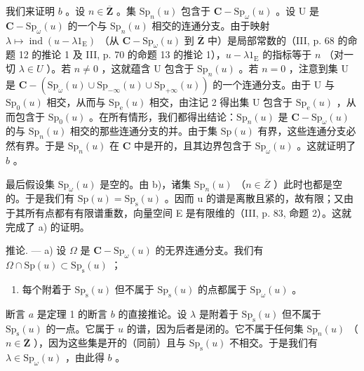 我们来证明 \(b\) 。设 \(n \in \overline{\mathbf{Z}}\) 。集 \(\mathrm{Sp}_n(u)\) 包含于 \(\mathbf{C} - \mathrm{Sp}_{\omega}(u)\) 。设 U 是 \(\mathbf{C} - \mathrm{Sp}_{\omega}(u)\) 的一个与 \(\mathrm{Sp}_n(u)\) 相交的连通分支。由于映射 \(\lambda \mapsto \operatorname{ind}(u - \lambda 1_{\mathrm{E}})\) （从 \(\mathbf{C} - \mathrm{Sp}_{\omega}(u)\) 到 \(\overline{\mathbf{Z}}\) 中）是局部常数的（III, p. 68 的命题 12 的推论 1 及 III, p. 70 的命题 13 的推论 1），\(u - \lambda 1_{\mathrm{E}}\) 的指标等于 \(n\) （对一切 \(\lambda \in U\) ）。若 \(n \neq 0\) ，这就蕴含 U 包含于 \(\mathrm{Sp}_n(u)\) 。若 \(n = 0\) ，注意到集 U 是 \(\mathbf{C} - (\mathrm{Sp}_{\omega}(u) \cup \mathrm{Sp}_{-\infty}(u) \cup \mathrm{Sp}_{+\infty}(u))\) 的一个连通分支。由于 U 与 \(\mathrm{Sp}_0(u)\) 相交，从而与 \(\mathrm{Sp}_{\mathrm{e}}(u)\) 相交，由注记 2 得出集 U 包含于 \(\mathrm{Sp}_{\mathrm{e}}(u)\) ，从而包含于 \(\mathrm{Sp}_0(u)\) 。在所有情形，我们都得出结论：\(\mathrm{Sp}_n(u)\) 是 \(\mathbf{C} - \mathrm{Sp}_{\omega}(u)\) 的与 \(\mathrm{Sp}_n(u)\) 相交的那些连通分支的并。由于集 \(\mathrm{Sp}(u)\) 有界，这些连通分支必然有界。于是 \(\mathrm{Sp}_n(u)\) 在 \(\mathbf{C}\) 中是开的，且其边界包含于 \(\mathrm{Sp}_{\omega}(u)\) 。这就证明了 \(b\) 。

最后假设集 \(\mathrm{Sp}_{\omega}(u)\) 是空的。由 b)，诸集 \(\mathrm{Sp}_{n}(u)\) （\(n \in \overline{Z}\) ）此时也都是空的。于是我们有 \(\mathrm{Sp}(u) = \mathrm{Sp}_{\mathrm{s}}(u)\) 。因而 u 的谱是离散且紧的，故有限；又由于其所有点都有有限谱重数，向量空间 E 是有限维的（III, p. 83, 命题 2）。这就完成了 a) 的证明。

推论. --- a) 设 \(\Omega\) 是 \(\mathbf{C} - \mathrm{Sp}_{\omega}(u)\) 的无界连通分支。我们有 \(\Omega \cap \mathrm{Sp}(u) \subset \mathrm{Sp}_{\mathrm{s}}(u)\) ；

\begin{enumerate}
\def\labelenumi{\alph{enumi})}
\setcounter{enumi}{1}
\tightlist
\item
  每个附着于 \(\mathrm{Sp}_{\mathrm{s}}(u)\) 但不属于 \(\mathrm{Sp}_{\mathrm{s}}(u)\) 的点都属于 \(\mathrm{Sp}_{\omega}(u)\) 。
\end{enumerate}

断言 \(a\) 是定理 1 的断言 \(b\) 的直接推论。设 \(\lambda\) 是附着于 \(\mathrm{Sp}_{\mathrm{s}}(u)\) 但不属于 \(\mathrm{Sp}_{\mathrm{s}}(u)\) 的一点。它属于 \(u\) 的谱，因为后者是闭的。它不属于任何集 \(\mathrm{Sp}_{n}(u)\) （\(n \in \overline{\mathbf{Z}}\) ），因为这些集是开的（同前）且与 \(\mathrm{Sp}_{\mathrm{s}}(u)\) 不相交。于是我们有 \(\lambda \in \mathrm{Sp}_{\omega}(u)\) ，由此得 \(b\) 。

